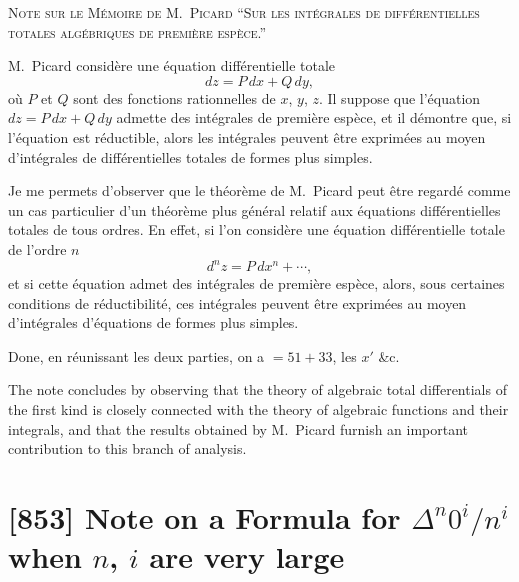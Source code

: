 \documentclass[11pt,a4paper]{article}
\theoremstyle{definition}
\begin{document}
\smallskip

\noindent\textsc{Note sur le M\'{e}moire de M.\ Picard ``Sur les int\'{e}grales de diff\'{e}rentielles totales alg\'{e}briques de premi\`{e}re esp\`{e}ce.''}

\medskip

\noindent M.\ Picard consid\`{e}re une \'{e}quation diff\'{e}rentielle totale
\[
dz = P\,dx + Q\,dy,
\]
o\`{u} $P$ et $Q$ sont des fonctions rationnelles de $x$, $y$, $z$. Il suppose que l'\'{e}quation $dz = P\,dx + Q\,dy$ admette des int\'{e}grales de premi\`{e}re esp\`{e}ce, et il d\'{e}montre que, si l'\'{e}quation est r\'{e}ductible, alors les int\'{e}grales peuvent \^{e}tre exprim\'{e}es au moyen d'int\'{e}grales de diff\'{e}rentielles totales de formes plus simples.

\smallskip

\noindent Je me permets d'observer que le th\'{e}or\`{e}me de M.\ Picard peut \^{e}tre regard\'{e} comme un cas particulier d'un th\'{e}or\`{e}me plus g\'{e}n\'{e}ral relatif aux \'{e}quations diff\'{e}rentielles totales de tous ordres. En effet, si l'on consid\`{e}re une \'{e}quation diff\'{e}rentielle totale de l'ordre $n$
\[
d^{n}z = P\,dx^{n} + \cdots,
\]
et si cette \'{e}quation admet des int\'{e}grales de premi\`{e}re esp\`{e}ce, alors, sous certaines conditions de r\'{e}ductibilit\'{e}, ces int\'{e}grales peuvent \^{e}tre exprim\'{e}es au moyen d'int\'{e}grales d'\'{e}quations de formes plus simples.

\smallskip

\noindent Done, en r\'{e}unissant les deux parties, on a $= 51 + 33$, les $x'$ \&c.

\medskip

\noindent The note concludes by observing that the theory of algebraic total differentials of the first kind is closely connected with the theory of algebraic functions and their integrals, and that the results obtained by M.\ Picard furnish an important contribution to this branch of analysis.

\newpage
\section*{[853] Note on a Formula for $\Delta^{n}0^{i}/n^{i}$ when $n$, $i$ are very large}
\end{document}

